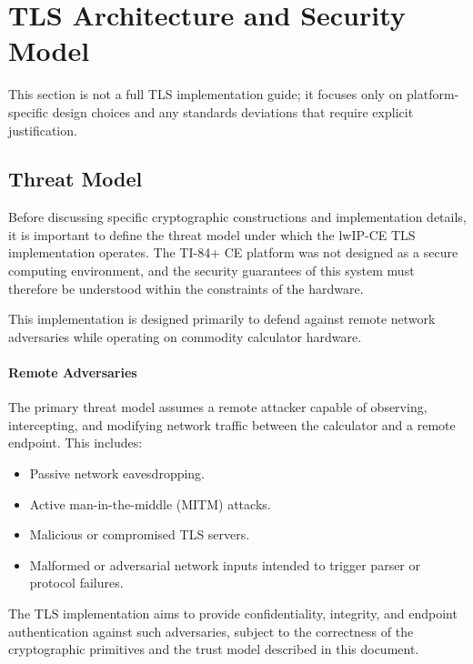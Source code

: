 \documentclass[titlepage]{report}
\begin{document}
			
			
		\newpage
		\section{TLS Architecture and Security Model}
	
	This section is not a full TLS implementation guide; it focuses only on platform-specific design choices and any standards deviations that require explicit justification.
	
	\subsection{Threat Model}
	
	Before discussing specific cryptographic constructions and implementation details, it is important to define the threat model under which the lwIP-CE TLS implementation operates. The TI-84+ CE platform was not designed as a secure computing environment, and the security guarantees of this system must therefore be understood within the constraints of the hardware.
	
	This implementation is designed primarily to defend against remote network adversaries while operating on commodity calculator hardware.
	
	\paragraph{Remote Adversaries}
	
	The primary threat model assumes a remote attacker capable of observing, intercepting, and modifying network traffic between the calculator and a remote endpoint. This includes:
	
	\begin{itemize}
		\item Passive network eavesdropping.
		\item Active man-in-the-middle (MITM) attacks.
		\item Malicious or compromised TLS servers.
		\item Malformed or adversarial network inputs intended to trigger parser or protocol failures.
	\end{itemize}
	
	The TLS implementation aims to provide confidentiality, integrity, and endpoint authentication against such adversaries, subject to the correctness of the cryptographic primitives and the trust model described in this document.
	
\end{document}
